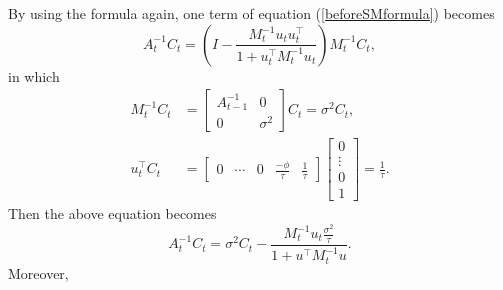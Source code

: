 By using the formula again, one term of equation (\ref{beforeSMformula}) becomes 
\begin{equation}
A_{t}^{-1}C_{t} = \left( I - \frac{M_{t}^{-1}u_{t}u_{t}^\top }{1+u_{t}^\top M_{t}^{-1} u_{t}} \right)M_{t}^{-1}C_{t},
\end{equation}
in which
\begin{align*}
M_{t}^{-1}C_{t}    &=\left[ \begin{array}{cc} A_{t-1}^{-1} & 0 \\ 0 & \sigma^2 \end{array} \right]C_{t}=\sigma^2 C_{t},\\
u_{t}^\top C_{t} & = \left[ \begin{array}{ccccc} 0 & \cdots & 0 &\frac{-\phi}{\tau} & \frac{1}{\tau} \end{array} \right] \left[ \begin{array}{c} 0 \\ \vdots \\ 0\\ 1 \end{array} \right]= \frac{1}{\tau}.
\end{align*}
Then the above equation becomes
\begin{equation}
A_{t}^{-1}C_{t} = \sigma^2 C_{t}-\frac{M_{t}^{-1} u_{t} \frac{\sigma^2}{\tau}}{1+u^\top M_{t}^{-1} u}.
\end{equation}
Moreover,
